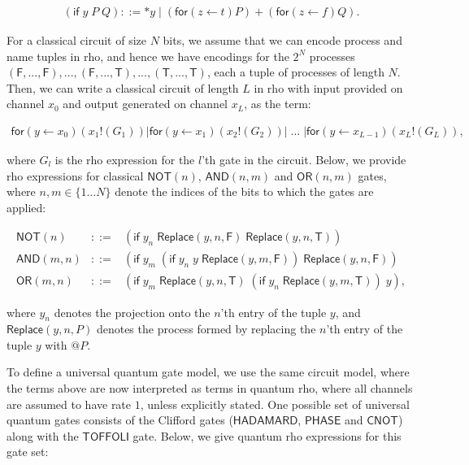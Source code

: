 \begin{eqnarray}
(\mathsf{if} \; y \; P \; Q) ::= \mathsf{*}y \; \mathsf{|} \; (\mathsf{for}(z\leftarrow t)P) + (\mathsf{for}(z\leftarrow f)Q).
\end{eqnarray}

\noindent For a classical circuit of size $N$ bits, we assume that we can encode process and name tuples in rho, and hence we have encodings for the $2^N$ processes $(\mathsf{F},...,\mathsf{F}),...,(\mathsf{F},...,\mathsf{T}),...,(\mathsf{T},...,\mathsf{T})$, each a tuple of processes of length $N$.  Then, we can write a classical circuit of length $L$ in rho with input provided on channel $x_0$ and output generated on channel $x_L$, as the term:

\begin{eqnarray}
\mathsf{for}(y\leftarrow x_0)(x_1 \mathsf{!}(G_1)) \mathsf{|} \mathsf{for}(y\leftarrow x_1)(x_2 \mathsf{!}(G_2)) \mathsf{|} \; ... \; \mathsf{|} \mathsf{for}(y\leftarrow x_{L-1})(x_L \mathsf{!}(G_L)),
\end{eqnarray}

\noindent where $G_l$ is the rho expression for the $l$’th gate in the circuit.  Below, we provide rho expressions for classical $\mathsf{NOT}(n)$, $\mathsf{AND}(n,m)$ and $\mathsf{OR}(n,m)$ gates, where $n,m\in\{1…N\}$ denote the indices of the bits to which the gates are applied:

\begin{eqnarray}
\mathsf{NOT}(n) &::=& (\mathsf{if} \; y_n \; \mathsf{Replace}(y,n,\mathsf{F}) \; \mathsf{Replace}(y,n,\mathsf{T})) \nonumber \\
\mathsf{AND}(m,n) &::=& (\mathsf{if} \; y_m \; (\mathsf{if} \; y_n \; y \; \mathsf{Replace}(y,m,\mathsf{F})) \; \mathsf{Replace}(y,n,\mathsf{F})) \nonumber \\
\mathsf{OR}(m,n) &::=& (\mathsf{if} \; y_m \; \mathsf{Replace}(y,n,\mathsf{T}) \; (\mathsf{if} \; y_n \; \mathsf{Replace}(y,m,\mathsf{T})) \; y),
\end{eqnarray}

\noindent where $y_n$ denotes the projection onto the $n$’th entry of the tuple $y$, and $\mathsf{Replace}(y,n,P)$ denotes the process formed by replacing the $n$’th entry of the tuple $y$ with $@P$.

To define a universal quantum gate model, we use the same circuit model, where the terms above are now interpreted as terms in quantum rho, where all channels are assumed to have rate $1$, unless explicitly stated.  One possible set of universal quantum gates consists of the Clifford gates ($\mathsf{HADAMARD}$, $\mathsf{PHASE}$ and $\mathsf{CNOT}$) along with the $\mathsf{TOFFOLI}$ gate. Below, we give quantum rho expressions for this gate set:

